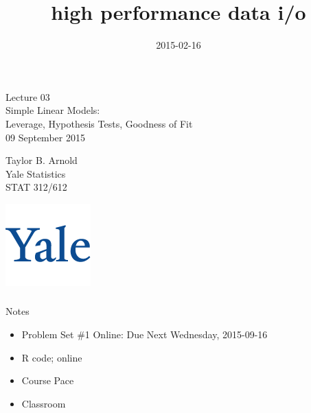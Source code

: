 

\title{high performance data i/o}
\date{2015-02-16}



\begin{frame}[fragile] \frametitle{}

\vfill

{\fontsize{0.7cm}{0cm}\selectfont Lecture 03 \\\vspace{0.2cm} Simple Linear Models:\\
Leverage, Hypothesis Tests, Goodness of Fit}\\\vspace{0.5cm}
09 September 2015

\vspace{2cm}

\begin{minipage}{0.6\textwidth}
Taylor B. Arnold \\
Yale Statistics \\
STAT 312/612
\end{minipage}
\hfill
\begin{minipage}{0.3\textwidth}\raggedleft
\includegraphics[scale=0.3]{../yale-logo.png}
\end{minipage}%

\end{frame}


\begin{frame}[fragile] \frametitle{}

{\color{yaleblue}\fontsize{16pt}{20pt}\selectfont Notes}

\begin{itemize}
\item Problem Set \#1 Online: Due Next Wednesday, 2015-09-16
\item R code; online
\item Course Pace
\item Classroom
\end{itemize}

\end{frame}

